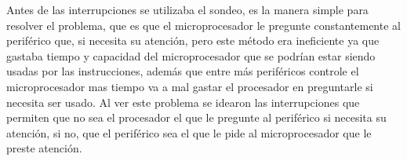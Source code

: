 \documentclass[12pt]{article}
\begin{document}
\large
Antes de las interrupciones se utilizaba el sondeo, es la manera simple para resolver el problema, que es que el microprocesador le pregunte constantemente al periférico que, si necesita su atención, pero este método era ineficiente ya que gastaba tiempo y capacidad del microprocesador que se podrían estar siendo usadas por las instrucciones, además que entre más periféricos controle el microprocesador mas tiempo va a mal gastar el procesador en preguntarle si necesita ser usado. Al ver este problema se idearon las interrupciones que permiten que no sea el procesador el que le pregunte al periférico si necesita su atención, si no, que el periférico sea el que le pide al microprocesador que le preste atención.\cite{interruptsmadeeasy}

\newpage

 


\end{document}
